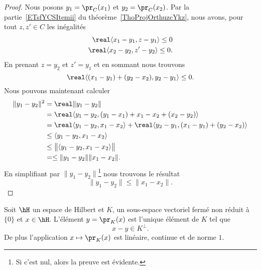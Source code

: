 \begin{proof}
    Nous posons \( y_1=\pr_C(x_1)\) et \( y_2=\pr_C(x_2)\). Par la partie~\ref{ETsfYCSItemii} du théorème~\ref{ThoProjOrthuzcYkz}, nous avons, pour tout \( z,z'\in C\) les inégalités
    \begin{subequations}
        \begin{align}
            \real\langle x_1-y_1, z-y_1\rangle \leq 0\\
            \real\langle x_2-y_2, z'-y_2\rangle \leq 0.
        \end{align}
    \end{subequations}
    En prenant \( z=y_2\) et \( z'=y_1\) et en sommant nous trouvons
    \begin{equation}
        \real\langle (x_1-y_1)+(y_2-x_2), y_2-y_1\rangle \leq 0.
    \end{equation}
    Nous pouvons maintenant calculer
    \begin{equation}
        \begin{aligned}[]
            \| y_1-y_2 \|^2&=\real\| y_1-y_2 \|\\
            &=\real\langle y_1-y_2, (y_1-x_1)+x_1-x_2+(x_2-y_2)\rangle \\
            &=\real\langle y_1-y_2, x_1-x_2\rangle +\real\langle y_2-y_1, (x_1-y_1)+(y_2-x_2)\rangle \\
            &\leq\langle y_1-y_2, x_1-x_2\rangle \\
            &\leq\big\| \langle y_1-y_2, x_1-x_2\rangle  \big\|\\
            &=\leq \| y_1-y_2 \|\| x_1-x_2 \|.
        \end{aligned}
    \end{equation}
    En simplifiant par \( \| y_1-y_2 \|\)\footnote{Si c'est nul, alors la preuve est évidente.} nous trouvons le résultat
    \begin{equation}
        \| y_1-y_2 \|\leq \| x_1-x_2 \|.
    \end{equation}
\end{proof}

\begin{theorem}      \label{ThoMXwOjb}
    Soit \( \hH\) un espace de Hilbert et \( K\), un sous-espace vectoriel fermé non réduit à \( \{ 0 \}\) et \( x\in\hH\). L'élément \( y=\pr_K(x)\) est l'unique élément de \( K\) tel que
    \begin{equation}
        x-y\in K^{\perp}.
    \end{equation}
    De plus l'application \( x\mapsto\pr_K(x)\) est linéaire, continue et de norme \( 1\).
\end{theorem}

